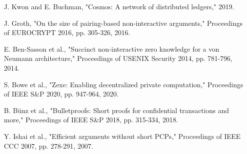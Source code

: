 \documentclass[11pt,a4paper]{article}
\begin{document}
\begin{thebibliography}{99}
J. Kwon and E. Buchman, "Cosmos: A network of distributed ledgers," 2019.

J. Groth, "On the size of pairing-based non-interactive arguments," Proceedings of EUROCRYPT 2016, pp. 305-326, 2016.

E. Ben-Sasson et al., "Succinct non-interactive zero knowledge for a von Neumann architecture," Proceedings of USENIX Security 2014, pp. 781-796, 2014.

S. Bowe et al., "Zexe: Enabling decentralized private computation," Proceedings of IEEE S\&P 2020, pp. 947-964, 2020.

B. Bünz et al., "Bulletproofs: Short proofs for confidential transactions and more," Proceedings of IEEE S\&P 2018, pp. 315-334, 2018.

Y. Ishai et al., "Efficient arguments without short PCPs," Proceedings of IEEE CCC 2007, pp. 278-291, 2007.

\end{thebibliography}
\end{document}
